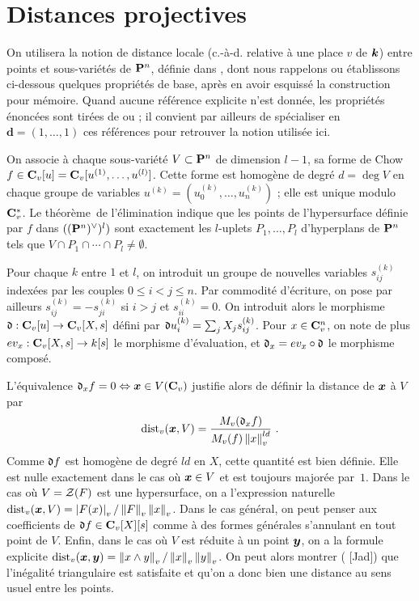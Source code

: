 \section{Distances projectives}

On utilisera la notion de distance locale (c.-à-d. relative à une place $v$ de
$\boldsymbol{k}$) entre points et sous-variétés de $\mathbf{P}^n$, définie dans \cite{phi1},
dont nous rappelons ou établissons ci-dessous quelques propriétés de base,
après en avoir esquissé la construction pour mémoire. Quand aucune référence
explicite n'est donnée, les propriétés énoncées sont tirées de \cite{phi1} ou
\cite{rem1} ; il convient par ailleurs de spécialiser en $\mathbf{d} = (1,
\dots, 1)$ ces références pour retrouver la notion utilisée ici.

On associe à chaque sous-variété $V \subset \mathbf{P}^n$ de dimension $l-1$, sa
forme de Chow $f \in \mathbf{C}_v[u] = \mathbf{C}_v[u^{(1)}, \dots, u^{(l)}]$. Cette forme est
homogène de degré $d = \deg V$ en chaque groupe de variables $u^{(k)} =
(u^{(k)}_0, \dots, u^{(k)}_n)$ ; elle est unique modulo $\mathbf{C}_v^{*}$. Le
théorème~de l'élimination indique que les points de l'hypersurface définie par
$f$ dans $((\mathbf{P}^n)^\vee)^l)$ sont exactement les $l$-uplets $P_1, \dots,
P_l$ d'hyperplans de $\mathbf{P}^n$ tels que $V \cap P_1 \cap \cdots \cap P_l \neq
\emptyset$.

Pour chaque $k$ entre $1$ et $l$, on introduit un groupe de nouvelles
variables $s^{(k)}_{ij}$ indexées par les couples $0 \le i < j \le n$. Par
commodité d'écriture, on pose par ailleurs $s^{(k)}_{ij} = - s^{(k)}_{ji}$ si
$i > j$ et $s^{(k)}_{ii} = 0$. On introduit alors le morphisme $\mathfrak{d} : \mathbf{C}_v[u]
\to \mathbf{C}_v[X, s]$ défini par $\mathfrak{d} u^{(k)}_i = \sum_j X_j s^{(k)}_{ij}$. Pour $x
\in \mathbf{C}_v^n$, on note de plus $ev_x : \mathbf{C}_v[X, s] \to k[s]$ le morphisme
d'évaluation, et $\mathfrak{d}_x = ev_x \circ \mathfrak{d}$ le morphisme composé.

L'équivalence $\mathfrak{d}_x f = 0 \Leftrightarrow \boldsymbol{x} \in V(\mathbf{C}_v)$ justifie alors de
définir la distance de $\boldsymbol{x}$ à $V$ par
\[
  \mathrm{dist}_v(\boldsymbol{x}, V) = \frac{M_v(\mathfrak{d}_x f)}{M_v(f) \left\lVert x\right\rVert_{v} ^{ld}} \text{ .}
\]
Comme $\mathfrak{d} f$ est homogène de degré $ld$ en $X$, cette quantité est bien
définie. Elle est nulle exactement dans le cas où $\boldsymbol{x} \in V$ et est toujours
majorée par~$1$. Dans le cas où $V = \mathcal Z(F)$ est une hypersurface, on a
l'expression naturelle $\mathrm{dist}_v(\boldsymbol{x}, V) = \left\lvert F(x)\right\rvert_{v} / \left\lVert F\right\rVert_{v} \left\lVert x\right\rVert_{v}$. Dans le cas
général, on peut penser aux coefficients de $\mathfrak{d} f \in \mathbf{C}_v[X][s]$ comme à des
formes générales s'annulant en tout point de $V$. Enfin, dans le cas où $V$
est réduite à un point $\boldsymbol{y}$, on a la formule explicite $\mathrm{dist}_v (\boldsymbol{x}, \boldsymbol{y}) =
\left\lVert x \wedge y\right\rVert_{v} / \left\lVert x\right\rVert_{v} \left\lVert y\right\rVert_{v}$. On peut alors montrer ( [Jad])
que l'inégalité triangulaire est satisfaite et qu'on a donc bien une distance
au sens usuel entre les points.

